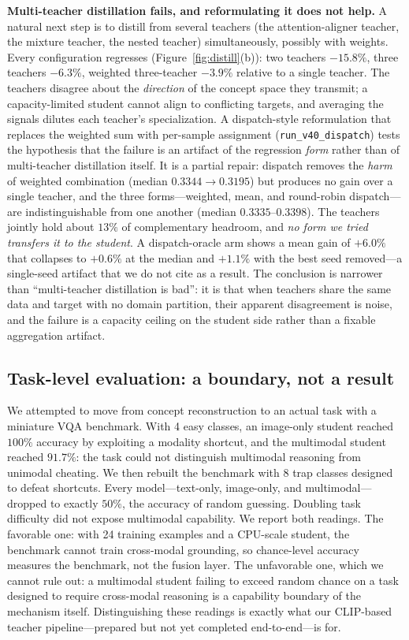 \documentclass[10pt]{article}
\theoremstyle{definition}
\theoremstyle{plain}
\theoremstyle{remark}
\begin{document}
\textbf{Multi-teacher distillation fails, and reformulating it does not help.} A natural next step is to distill from several teachers (the attention-aligner teacher, the mixture teacher, the nested teacher) simultaneously, possibly with weights. Every configuration regresses (Figure~\ref{fig:distill}(b)): two teachers $-15.8\%$, three teachers $-6.3\%$, weighted three-teacher $-3.9\%$ relative to a single teacher. The teachers disagree about the \emph{direction} of the concept space they transmit; a capacity-limited student cannot align to conflicting targets, and averaging the signals dilutes each teacher's specialization. A dispatch-style reformulation that replaces the weighted sum with per-sample assignment (\texttt{run\_v40\_dispatch}) tests the hypothesis that the failure is an artifact of the regression \emph{form} rather than of multi-teacher distillation itself. It is a partial repair: dispatch removes the \emph{harm} of weighted combination (median $0.3344 \rightarrow 0.3195$) but produces no gain over a single teacher, and the three forms---weighted, mean, and round-robin dispatch---are indistinguishable from one another (median $0.3335$--$0.3398$). The teachers jointly hold about $13\%$ of complementary headroom, and \emph{no form we tried transfers it to the student}. A dispatch-oracle arm shows a mean gain of $+6.0\%$ that collapses to $+0.6\%$ at the median and $+1.1\%$ with the best seed removed---a single-seed artifact that we do not cite as a result. The conclusion is narrower than ``multi-teacher distillation is bad'': it is that when teachers share the same data and target with no domain partition, their apparent disagreement is noise, and the failure is a capacity ceiling on the student side rather than a fixable aggregation artifact.

\subsection{Task-level evaluation: a boundary, not a result}
\label{sec:vqa-exp}

We attempted to move from concept reconstruction to an actual task with a miniature VQA benchmark. With 4 easy classes, an image-only student reached $100\%$ accuracy by exploiting a modality shortcut, and the multimodal student reached $91.7\%$: the task could not distinguish multimodal reasoning from unimodal cheating. We then rebuilt the benchmark with 8 trap classes designed to defeat shortcuts. Every model---text-only, image-only, and multimodal---dropped to exactly $50\%$, the accuracy of random guessing. Doubling task difficulty did not expose multimodal capability. We report both readings. The favorable one: with 24 training examples and a CPU-scale student, the benchmark cannot train cross-modal grounding, so chance-level accuracy measures the benchmark, not the fusion layer. The unfavorable one, which we cannot rule out: a multimodal student failing to exceed random chance on a task designed to require cross-modal reasoning is a capability boundary of the mechanism itself. Distinguishing these readings is exactly what our CLIP-based \citep{radford2021} teacher pipeline---prepared but not yet completed end-to-end---is for.
\end{document}
